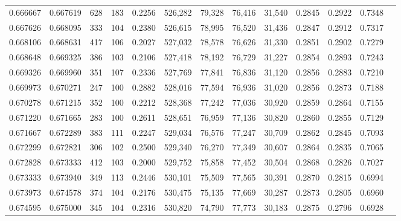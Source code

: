 \begin{tabular}{rrrrrrrrrrrrr}
0.666667 & 0.667619 &    628 &   183 &                                     0.2256 & 526,282 &  79,328 &  76,416 &  31,540 & 0.2845 & 0.2922 & 0.7348 \\
0.667626 & 0.668095 &    333 &   104 &                                     0.2380 & 526,615 &  78,995 &  76,520 &  31,436 & 0.2847 & 0.2912 & 0.7317 \\
0.668106 & 0.668631 &    417 &   106 &                                     0.2027 & 527,032 &  78,578 &  76,626 &  31,330 & 0.2851 & 0.2902 & 0.7279 \\
0.668648 & 0.669325 &    386 &   103 &                                     0.2106 & 527,418 &  78,192 &  76,729 &  31,227 & 0.2854 & 0.2893 & 0.7243 \\
0.669326 & 0.669960 &    351 &   107 &                                     0.2336 & 527,769 &  77,841 &  76,836 &  31,120 & 0.2856 & 0.2883 & 0.7210 \\
0.669973 & 0.670271 &    247 &   100 &                                     0.2882 & 528,016 &  77,594 &  76,936 &  31,020 & 0.2856 & 0.2873 & 0.7188 \\
0.670278 & 0.671215 &    352 &   100 &                                     0.2212 & 528,368 &  77,242 &  77,036 &  30,920 & 0.2859 & 0.2864 & 0.7155 \\
0.671220 & 0.671665 &    283 &   100 &                                     0.2611 & 528,651 &  76,959 &  77,136 &  30,820 & 0.2860 & 0.2855 & 0.7129 \\
0.671667 & 0.672289 &    383 &   111 &                                     0.2247 & 529,034 &  76,576 &  77,247 &  30,709 & 0.2862 & 0.2845 & 0.7093 \\
0.672299 & 0.672821 &    306 &   102 &                                     0.2500 & 529,340 &  76,270 &  77,349 &  30,607 & 0.2864 & 0.2835 & 0.7065 \\
0.672828 & 0.673333 &    412 &   103 &                                     0.2000 & 529,752 &  75,858 &  77,452 &  30,504 & 0.2868 & 0.2826 & 0.7027 \\
0.673333 & 0.673940 &    349 &   113 &                                     0.2446 & 530,101 &  75,509 &  77,565 &  30,391 & 0.2870 & 0.2815 & 0.6994 \\
0.673973 & 0.674578 &    374 &   104 &                                     0.2176 & 530,475 &  75,135 &  77,669 &  30,287 & 0.2873 & 0.2805 & 0.6960 \\
0.674595 & 0.675000 &    345 &   104 &                                     0.2316 & 530,820 &  74,790 &  77,773 &  30,183 & 0.2875 & 0.2796 & 0.6928 \\

\end{tabular}
